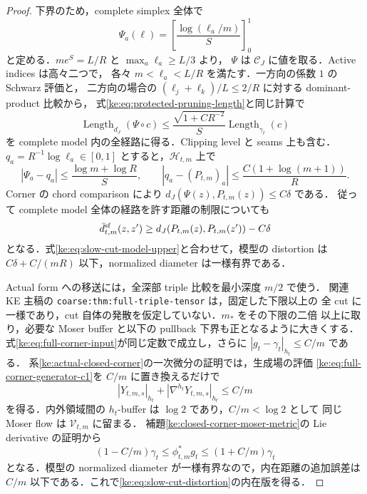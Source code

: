 \begin{proof}
下界のため，complete simplex 全体で
\[
 \Psi_a(\ell)=\left[\frac{\log(\ell_a/m)}S\right]_0^1
\]
と定める．$m e^S=L/R$ と $\max_a\ell_a\ge L/3$ より，
$\Psi$ は $\mathcal C_J$ に値を取る．Active indices は高々二つで，
各々 $m<\ell_a<L/R$ を満たす．一方向の係数 $1$ の Schwarz 評価と，
二方向の場合の $(\ell_j+\ell_k)/L\le2/R$ に対する dominant-product 比較から，
式\eqref{ke:eq:protected-pruning-length}と同じ計算で
\begin{equation}\label{ke:eq:slow-cut-pruning-length}
 \operatorname{Length}_{d_J}(\Psi\circ c)
 \le\frac{\sqrt{1+CR^{-2}}}{S}
       \operatorname{Length}_{\gamma_t}(c)
\end{equation}
を complete model 内の全経路に得る．Clipping level と seams 上も含む．
$q_a=R^{-1}\log\ell_a\in[0,1]$ とすると，$\mathcal H_{t,m}$ 上で
\[
 |\Psi_a-q_a|\le\frac{\log m+\log R}{S},\qquad
 |q_a-(P_{t,m})_a|\le\frac{C(1+\log(m+1))}{R}.
\]
Corner の chord comparison により
$d_J(\Psi(z),P_{t,m}(z))\le C\delta$ である．
従って complete model 全体の経路を許す距離の制限についても
\[
 \bar d_{t,m}^{\rm sf}(z,z')
 \ge d_J(P_{t,m}(z),P_{t,m}(z'))-C\delta
\]
となる．式\eqref{ke:eq:slow-cut-model-upper}と合わせて，模型の distortion は
$C\delta+C/(mR)$ 以下，normalized diameter は一様有界である．

Actual form への移送には，全深部 triple 比較を最小深度 $m/2$ で使う．
関連 KE 主稿の \texttt{coarse:thm:full-triple-tensor} は，固定した下限以上の
全 cut に一様であり，cut 自体の発散を仮定していない．$m_*$ をその下限の二倍
以上に取り，必要な Moser buffer と以下の pullback 下界も正となるように大きくする．
式\eqref{ke:eq:full-corner-input}が同じ定数で成立し，さらに
$|g_t-\gamma_t|_{h_t}\le C/m$ である．
系\ref{ke:actual-closed-corner}の一次微分の証明では，生成場の評価
\eqref{ke:eq:full-corner-generator-c1}を $C/m$ に置き換えるだけで
\[
 |Y_{t,m,s}|_{h_t}+|\nabla^{h_t}Y_{t,m,s}|_{h_t}\le C/m
\]
を得る．内外領域間の $h_t$-buffer は $\log2$ であり，$C/m<\log2$ として
同じ Moser flow は $\mathcal V_{t,m}$ に留まる．
補題\ref{ke:closed-corner-moser-metric}の Lie derivative の証明から
\[
 (1-C/m)\gamma_t\le\phi_{t,m}^*g_t\le(1+C/m)\gamma_t
\]
となる．模型の normalized diameter が一様有界なので，内在距離の追加誤差は
$C/m$ 以下である．これで\eqref{ke:eq:slow-cut-distortion}の内在版を得る．


\end{proof}

